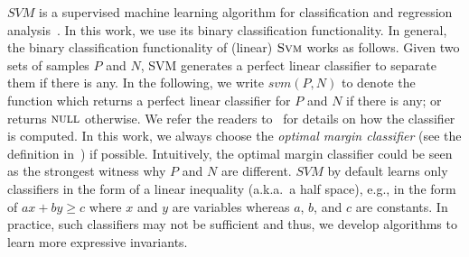 

$\mathit{SVM}$ is a supervised machine learning algorithm for classification and regression analysis~\cite{svm:original}. In this work, we use its binary classification functionality.
In general, the binary classification functionality of (linear) $\textsc{Svm}$ works as follows.
Given two sets of samples $P$ and $N$, SVM generates a perfect linear classifier to separate them if there is any.
In the following, we write $\mathit{svm}(P, N)$ to denote the function which returns a perfect linear classifier for $P$ and $N$ if there is any; or returns $\textsc{null}$ otherwise.
We refer the readers to~\cite{svm:smo} for details on how the classifier is computed.
In this work, we always choose the \textit{optimal margin classifier} (see the definition in~\cite{sharma2012interpolants}) if possible.
Intuitively, the optimal margin classifier could be seen as the strongest witness why $P$ and $N$ are different.
$\mathit{SVM}$ by default learns only classifiers in the form of a linear inequality (a.k.a.~a half space),
e.g., in the form of $\mathit{a x + b y \geq c}$ where $x$ and $y$ are variables whereas $a$, $b$, and $c$ are constants.
In practice, such classifiers may not be sufficient and thus, we develop algorithms to learn more expressive invariants.

